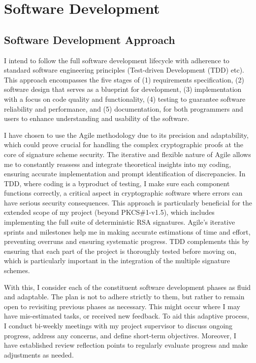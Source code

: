 \documentclass[]{final_report}
\theoremstyle{definition}
\begin{document}
\chapter{Software Development}
\section{Software Development Approach}
I intend to follow the full software development lifecycle with adherence to standard software engineering principles (Test-driven Development (TDD) etc). This approach encompasses the five stages of (1) requirements specification, (2) software design that serves as a blueprint for development, (3) implementation with a focus on code quality and functionality, (4) testing to guarantee software reliability and performance, and (5) documentation, for both programmers and users to enhance understanding and usability of the software.

I have chosen to use the Agile methodology due to its precision and adaptability, which could prove crucial for handling the complex cryptographic proofs at the core of signature scheme security. The iterative and flexible nature of Agile allows me to constantly reassess and integrate theoretical insights into my coding, ensuring accurate implementation and prompt identification of discrepancies. In TDD, where coding is a byproduct of testing, I make sure each component functions correctly, a critical aspect in cryptographic software where errors can have serious security consequences. This approach is particularly beneficial for the extended scope of my project (beyond PKCS\#1-v1.5), which includes implementing the full suite of deterministic RSA signatures. Agile's iterative sprints and milestones help me in making accurate estimations of time and effort, preventing overruns and ensuring systematic progress. TDD complements this by ensuring that each part of the project is thoroughly tested before moving on, which is particularly important in the integration of the multiple signature schemes. 

With this, I consider each of the constituent software development phases as fluid and adaptable. The plan is not to adhere strictly to them, but rather to remain open to revisiting previous phases as necessary. This might occur where I may have mis-estimated tasks, or received new feedback. To aid this adaptive process, I conduct bi-weekly meetings with my project supervisor to discuss ongoing progress, address any concerns, and define short-term objectives. Moreover, I have established review reflection points to regularly evaluate progress and make adjustments as needed.
\end{document}
